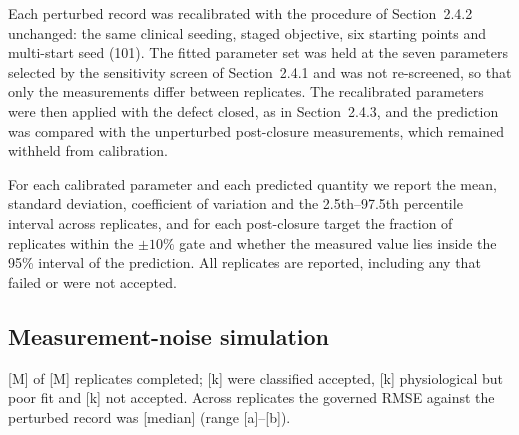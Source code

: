 Each perturbed record was recalibrated with the procedure of Section~2.4.2
unchanged: the same clinical seeding, staged objective, six starting points
and multi-start seed (101). The fitted parameter set was held at the seven
parameters selected by the sensitivity screen of Section~2.4.1 and was not
re-screened, so that only the measurements differ between replicates. The
recalibrated parameters were then applied with the defect closed, as in
Section~2.4.3, and the prediction was compared with the unperturbed
post-closure measurements, which remained withheld from calibration.

For each calibrated parameter and each predicted quantity we report the mean,
standard deviation, coefficient of variation and the 2.5th--97.5th percentile
interval across replicates, and for each post-closure target the fraction of
replicates within the $\pm10\%$ gate and whether the measured value lies
inside the 95\% interval of the prediction. All replicates are reported,
including any that failed or were not accepted.

\subsection{Measurement-noise simulation}

[M] of [M] replicates completed; [k] were classified accepted, [k]
physiological but poor fit and [k] not accepted. Across replicates the
governed RMSE against the perturbed record was [median] (range [a]--[b]).

